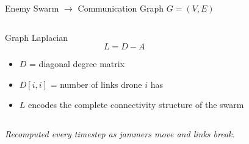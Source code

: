 \documentclass[10pt, aspectratio=169]{beamer}
\begin{document}
\begin{frame}{Enemy Swarm $\rightarrow$ Communication Graph $G = (V, E)$}
\begin{columns}[T,onlytextwidth]
\vspace{0cm}
\begin{exampleblock}{\small Graph Laplacian}
  \footnotesize
  \[
    L = D - A
  \]
  \vspace{-0.6cm}
  \begin{itemize}\scriptsize
    \item $D$ = diagonal degree matrix
    \item $D[i,i]$ = number of links drone $i$ has
    \item $L$ encodes the \alert{complete connectivity structure} of the swarm
  \end{itemize}
\end{exampleblock}
\end{columns}

\vspace{0cm}
\centering\footnotesize\textit{Recomputed every timestep as jammers move and links break.}
\end{frame}
\end{document}
